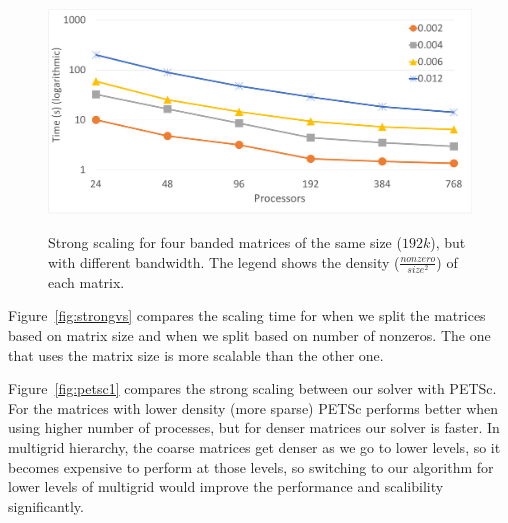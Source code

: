 \begin{figure}[p]
    \centering
    \includegraphics[width=12cm,height=6.2cm]{./figures/strong2.pdf}
    \caption{Strong scaling for four banded matrices of the same size ($192k$), but with different bandwidth. The legend shows the density ($\frac{nonzero}{size^2}$) of each matrix.}
    \label{fig:strong2}
\end{figure}

Figure~\ref{fig:strongvs} compares the scaling time for when we split the matrices based on matrix size and when we split based on number of nonzeros. The one that uses the matrix size is more scalable than the other one.

Figure~\ref{fig:petsc1} compares the strong scaling between our solver with PETSc. For the matrices with lower density (more sparse) PETSc performs better when using higher number of processes, but for denser matrices our solver is faster. In multigrid hierarchy, the coarse matrices get denser as we go to lower levels, so it becomes expensive to perform \mm at those levels, so switching to our algorithm for lower levels of multigrid would improve the performance and scalibility significantly.

